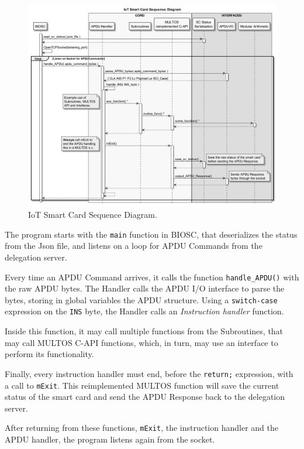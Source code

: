 \begin{figure}[bth]
	\begin{center}
		\includegraphics[width=\linewidth]{gfx/UML/sequenceBIOSC}
	\end{center}
	\caption{IoT Smart Card Sequence Diagram.}
	\label{fig:sequenceBIOSC}
\end{figure}



The program starts with the \texttt{main} function in BIOSC, that deserializes the status from the Json file, and listens on a loop for APDU Commands from the delegation server.

Every time an APDU Command arrives, it calls the function \texttt{handle\_APDU()} with the raw APDU bytes. The Handler calls the APDU I/O interface to parse the bytes, storing in global variables the APDU structure. Using a \texttt{switch-case} expression on the \texttt{INS} byte, the Handler calls an \textit{Instruction handler} function.

Inside this function, it may call multiple functions from the Subroutines, that may call MULTOS C-API functions, which, in turn, may use an interface to perform its functionality.

Finally, every instruction handler must end, before the \texttt{return;} expression, with a call to \texttt{mExit}. This reimplemented MULTOS function will save the current status of the smart card and send the APDU Response back to the delegation server.

After returning from these functions, \texttt{mExit}, the instruction handler and the APDU handler, the program listens again from the socket.


